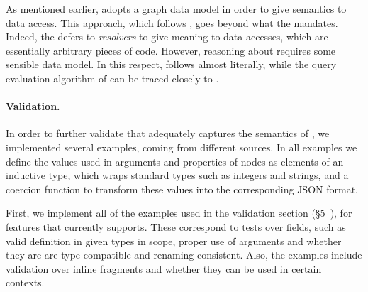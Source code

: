 As mentioned earlier, \gcoql adopts a graph data model in order to give semantics to data access. This approach, which follows \HP, goes beyond what the \spec mandates. Indeed, the \spec defers to {\em resolvers} to give meaning to data accesses, which are essentially arbitrary pieces of code. However, reasoning about \gql requires some sensible data model. In this respect, \gcoql follows \HP almost literally, while the query evaluation algorithm of \gcoql can be traced closely to \spec.





\paragraph{Validation.}

In order to further validate that \gcoql adequately captures the semantics of \gql, we implemented several examples, coming from different sources. 
In all examples we define the values used in arguments and properties of nodes as elements of an inductive type, which wraps standard \coq types such as integers and strings, 
and a coercion function to transform these values into the corresponding JSON format.


First, we implement all of the examples used in the \spec validation section (\cf\S5~\cite{gqlspec}), for features that \gcoql currently supports.
These correspond to tests over fields, such as valid definition in given types in scope, proper use of arguments and 
whether they are are type-compatible and renaming-consistent. Also, the examples include validation over inline fragments and 
whether they can be used in certain contexts. 

